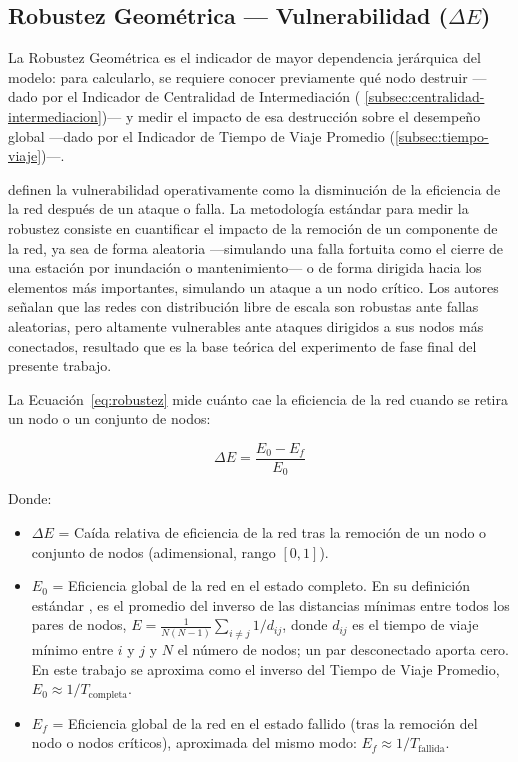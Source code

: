 
\subsection{Robustez Geométrica --- Vulnerabilidad \texorpdfstring{($\Delta E$)}{(Delta E)}}
\label{subsec:robustez-geometrica}

La Robustez Geométrica es el indicador de mayor dependencia jerárquica del
modelo: para calcularlo, se requiere conocer previamente qué nodo destruir
---dado por el Indicador de Centralidad de Intermediación (
\autoref{subsec:centralidad-intermediacion})--- y medir el impacto de esa
destrucción sobre el desempeño global ---dado por el Indicador de Tiempo de
Viaje Promedio (\autoref{subsec:tiempo-viaje})---.

\citet{lotero2014vulnerabilidad} definen la vulnerabilidad operativamente como
la disminución de la eficiencia de la red después de un ataque o falla. La
metodología estándar para medir la robustez consiste en cuantificar el impacto
de la remoción de un componente de la red, ya sea de forma aleatoria
---simulando una falla fortuita como el cierre de una estación por inundación o
mantenimiento--- o de forma dirigida hacia los elementos más importantes,
simulando un ataque a un nodo crítico. Los autores señalan que las redes con
distribución libre de escala son robustas ante fallas aleatorias, pero altamente
vulnerables ante ataques dirigidos a sus nodos más conectados, resultado que es
la base teórica del experimento de fase final del presente trabajo.

La Ecuación~\eqref{eq:robustez} mide cuánto cae la eficiencia de la red cuando
se retira un nodo o un conjunto de nodos:

\begin{equation}
    \Delta E = \frac{E_0 - E_f}{E_0}
    \label{eq:robustez}
\end{equation}

Donde:
\begin{itemize}
\item $\Delta E$ = Caída relativa de eficiencia de la red tras la remoción de un
    nodo o conjunto de nodos (adimensional, rango $[0, 1]$).
\item $E_0$ = Eficiencia global de la red en el estado completo. En su
    definición estándar \citep{latora2001efficient}, es el promedio del inverso
    de las distancias mínimas entre todos los pares de nodos,
    $E = \frac{1}{N(N-1)} \sum_{i \neq j} 1/d_{ij}$, donde $d_{ij}$ es el
    tiempo de viaje mínimo entre $i$ y $j$ y $N$ el número de nodos; un par
    desconectado aporta cero. En este trabajo se aproxima como el inverso del
    Tiempo de Viaje Promedio, $E_0 \approx 1 / T_{\text{completa}}$.
\item $E_f$ = Eficiencia global de la red en el estado fallido (tras la remoción
    del nodo o nodos críticos), aproximada del mismo modo:
    $E_f \approx 1 / T_{\text{fallida}}$.
\end{itemize}

